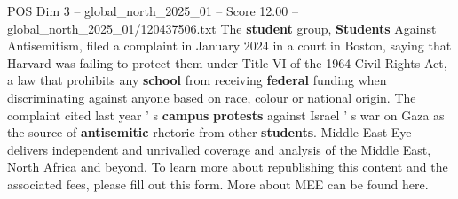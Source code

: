 \begin{textsample}{POS Dim 3 – global\_north\_2025\_01 – Score 12.00 – global\_north\_2025\_01/120437506.txt}
The \textbf{student} group, \textbf{Students} Against Antisemitism, filed a complaint in January 2024 in a court in Boston, saying that Harvard was failing to protect them under Title VI of the 1964 Civil Rights Act, a law that prohibits any \textbf{school} from receiving \textbf{federal} funding when discriminating against anyone based on race, colour or national origin.
The complaint cited last year ' s \textbf{campus} \textbf{protests} against Israel ' s war on Gaza as the source of \textbf{antisemitic} rhetoric from other \textbf{students}.
Middle East Eye delivers independent and unrivalled coverage and analysis of the Middle East, North Africa and beyond.
To learn more about republishing this content and the associated fees, please fill out this form.
More about MEE can be found here.

\end{textsample}
